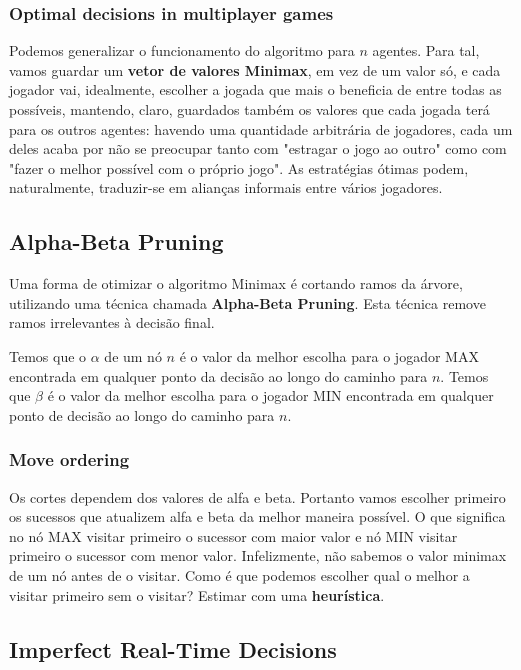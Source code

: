 \documentclass[11pt]{article}
\begin{document}
\subsubsection{Optimal decisions in multiplayer games}

Podemos generalizar o funcionamento do algoritmo para $n$ agentes. Para tal, vamos guardar um \textbf{vetor de valores Minimax}, em vez de um valor só, e cada jogador vai, idealmente, escolher a jogada que mais o beneficia de entre todas as possíveis, mantendo, claro, guardados também os valores que cada jogada terá para os outros agentes: havendo uma quantidade arbitrária de jogadores, cada um deles acaba por não se preocupar tanto com "estragar o jogo ao outro" como com "fazer o melhor possível com o próprio jogo". As estratégias ótimas podem, naturalmente, traduzir-se em alianças informais entre vários jogadores.

\subsection{Alpha-Beta Pruning}

Uma forma de otimizar o algoritmo Minimax é cortando ramos da árvore, utilizando uma técnica chamada \textbf{Alpha-Beta Pruning}. Esta técnica remove ramos irrelevantes à decisão final.

Temos que o $\alpha$ de um nó $n$ é o valor da melhor escolha para o jogador MAX encontrada em qualquer ponto da decisão ao longo do caminho para $n$. Temos que $\beta$ é o valor da melhor escolha para o jogador MIN encontrada em qualquer ponto de decisão ao longo do caminho para $n$.

\subsubsection{Move ordering}

Os cortes dependem dos valores de alfa e beta. Portanto vamos escolher primeiro os
sucessos que atualizem alfa e beta da melhor maneira possível. O que significa no nó MAX visitar primeiro o sucessor com maior valor e nó MIN visitar primeiro o sucessor com menor valor.
Infelizmente, não sabemos o valor minimax de um nó antes de o visitar. Como é que podemos escolher qual o melhor a visitar primeiro sem o visitar? Estimar com uma \textbf{heurística}.

\subsection{Imperfect Real-Time Decisions}
\end{document}
